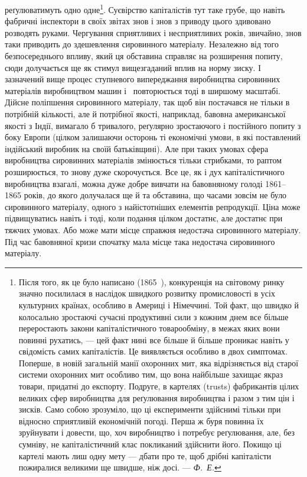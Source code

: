 реґулюватимуть одно одне\footnote{
Після того, як це було написано (1865~), конкуренція на світовому ринку
значно посилилася в наслідок швидкого розвитку промисловості в усіх культурних
країнах, особливо в Америці і Німеччині. Той факт, що швидко й колосально
зростаючі сучасні продуктивні сили з кожним днем все більше переростають
закони капіталістичного товарообміну, в межах яких вони повинні
рухатись, — цей факт нині все більше й більше проникає навіть у свідомість
самих капіталістів. Це виявляється особливо в двох симптомах. Поперше, в новій
загальній манії охоронних мит, яка відрізняється від старої системи охоронних
мит особливо тим, що вона найбільше захищає якраз товари, придатні до
експорту. Подруге, в картелях (trusts) фабрикантів цілих великих сфер виробництва
для реґулювання виробництва і разом з тим цін і зисків. Само собою
зрозуміло, що ці експерименти здійснимі тільки при відносно сприятливій
економічній погоді. Перша ж буря повинна їх зруйнувати і довести, що, хоч
виробництво і потребує реґулювання, але, без сумніву, не капіталістичний клас
покликаний здійснити його. Покищо ці картелі мають лиш одну мету —
дбати про те, щоб дрібні капіталісти пожиралися великими ще швидше, ніж
досі. — \emph{Ф.~Е.}
}. Суєвірство капіталістів тут таке
грубе, що навіть фабричні інспектори в своїх звітах знов і знов
з приводу цього здивовано розводять руками. Чергування сприятливих
і несприятливих років, звичайно, знов таки приводить до
здешевлення сировинного матеріалу. Незалежно від того безпосереднього
впливу, який ця обставина справляє на розширення
попиту, сюди долучається ще як стимул вищезгаданий
вплив на норму зиску. І зазначений вище процес ступневого
випереджання виробництва сировинних матеріалів виробництвом
машин і~ повторюється тоді в ширшому масштабі. Дійсне
поліпшення сировинного матеріалу, так щоб він постачався не
тільки в потрібній кількості, але й потрібної якості, наприклад,
бавовна американської якості з Індії, вимагало б тривалого, реґулярно
зростаючого і постійного попиту з боку Европи (цілком
залишаючи осторонь ті економічні умови, в які поставлений індійський
виробник на своїй батьківщині). Але при таких умовах
сфера виробництва сировинних матеріалів змінюється тільки
стрибками, то раптом розширюється, то знову дуже скорочується.
Все це, як і дух капіталістичного виробництва взагалі, можна
дуже добре вивчати на бавовняному голоді 1861--1865 років, до
якого долучалася ще й та обставина, що часами зовсім не було
сировинного матеріалу, одного з найістотніших елементів репродукції.
Ціна може підвищуватись навіть і тоді, коли подання
цілком достатнє, але достатнє при тяжчих умовах. Або може
мати місце справжня недостача сировинного матеріалу. Під час
бавовняної кризи спочатку мала місце така недостача сировинного
матеріалу.

